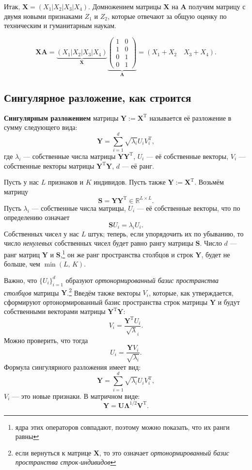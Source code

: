 \documentclass[12pt,a4paper,final]{article}
\begin{document}
\noindent Итак, $\bm X = \left( X_1 |  X_2 | X_3 |  X_4 \right).$ Домножением матрицы $\bm X$ на $\bm A$ получим матрицу с двумя новыми признаками $Z_1$ и $Z_2$, которые отвечают за общую оценку по техническим и гуманитарным наукам.

$$
\bm X \bm A = \underbrace{\left( X_1 |  X_2 | X_3 |  X_4 \right)}_{\bm X} \underbrace{\left( \begin{matrix} 1 & 0 \\ 1 & 0 \\ 0 & 1 \\ 0 & 1 \end{matrix} \right)}_{\bm A} =  \left( X_1 + X_2 \quad X_3 + X_4 \right).
$$

\subsection{Сингулярное разложение, как строится}

\textbf{Сингулярным разложением} матрицы $\bm Y := \bm X^\mathrm{T}$  называется её разложение в сумму следующего вида:
$$
\bm Y = \sum_{i = 1}^d \sqrt{\lambda_i} U_i V_i^\mathrm{T},
$$
где $\lambda_i$ --- собственные числа матрицы $\bm Y \bm Y^\mathrm{T}$, $U_i$ --- её собственные векторы, $V_i$ --- собственные векторы матрицы $\bm Y^\mathrm{T} \bm Y$, $d$ --- её ранг.

\dotfill

\noindent Пусть у нас $L$ признаков и $K$ индивидов.
Пусть также $\bm Y := \bm X^\mathrm{T}$.
Возьмём матрицу $$\bm S = \bm Y \bm Y^\mathrm{T} \in \mathbb{R}^{L \times L}.$$ Пусть $\lambda_i$ --- собственные числа матрицы, $U_i$ --- её собственные векторы, что по определению означает
$$
\bm S U_i = \lambda_i U_i.
$$
Собственных чисел у нас $L$ штук; теперь, если упорядочить их по убыванию, то число \textit{ненулевых} собственных чисел будет равно рангу матрицы $\bm S$. Число $d$ --- ранг матриц $\bm Y$ и $\bm S$,\footnote{ядра этих операторов совпадают, поэтому можно показать, что их ранги равны} он же ранг пространства столбцов и строк $\bm Y$, будет не больше, чем $\min{(L,\,K)}$. 

Важно, что $\{U_i\}_{i = 1}^{d}$ образуют \textit{ортонормированный базис пространства столбцов} матрицы $\bm Y$.\footnote{если вернуться к матрице $\bm  X$, то это означает \textit{ортонормированный базис пространства строк-индивидов}}
Введём также векторы $V_i$, которые, как утверждается, сформируют ортонормированный базис пространства строк матрицы $\bm Y$ и будут собственными векторами матрицы $\bm Y^\mathrm{T} \bm Y$:
$$
V_i = \frac{\bm Y^\mathrm{T} U_i}{\sqrt \lambda_i}.
$$ 
Можно проверить, что тогда
$$
U_i = \frac{\bm Y V_i}{\sqrt{\lambda_i}}.
$$
Формула сингулярного разложения имеет вид:
$$
\bm Y = \sum_{i = 1}^d \sqrt{\lambda_i} U_i V_i^\mathrm{T},
$$
$V_i$ --- это новые признаки. В матричном виде:
$$
\bm Y = \bm U \bm \Lambda^{1/2} \bm V^\mathrm{T}.
$$
\end{document}
